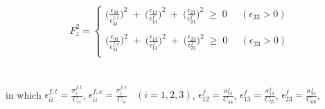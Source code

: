 \begin{equation}
F_{z}^{2} =  
	\begin{cases}

	\Big(\frac{\epsilon_{33}}{\epsilon_{33}^{f,t}}\Big)^{2} \; + \; \Big(\frac{\epsilon_{13}}{\epsilon_{13}^{f}}\Big)^{2} \; + \; \Big(\frac{\epsilon_{23}}{\epsilon_{23}^{f}}\Big)^{2} \; \geq  \; 0 \; \; \; \; \;  (\epsilon_{33}  >  0) \\

\\
	\Big(\frac{\epsilon_{33}}{\epsilon_{33}^{f,c}}\Big)^{2} \; + \; \Big(\frac{\epsilon_{13}}{\epsilon_{13}^{f}}\Big)^{2} \; + \; \Big(\frac{\epsilon_{23}}{\epsilon_{23}^{f}}\Big)^{2} \; \geq  \; 0 \; \; \; \; \;  (\epsilon_{33}  >  0) \\



	\end{cases}
\end{equation}
\\
\\
in which \; $\epsilon_{ii}^{f,t}  =   \frac{\sigma_{i}^{f,t}}{C_{ii}}$, \; $\epsilon_{ii}^{f,c}  =   \frac{\sigma_{i}^{f,c}}{C_{ii}} \;\;\; (i = 1,2,3)$, \; $\epsilon_{12}^{f}  =   \frac{\sigma_{12}^{f}}{C_{44}}$,  \; $\epsilon_{13}^{f}  =  \frac{\sigma_{13}^{f}}{C_{55}}$, \; $\epsilon_{23}^{f}  =   \frac{\sigma_{23}^{f}}{C_{66}}$,

